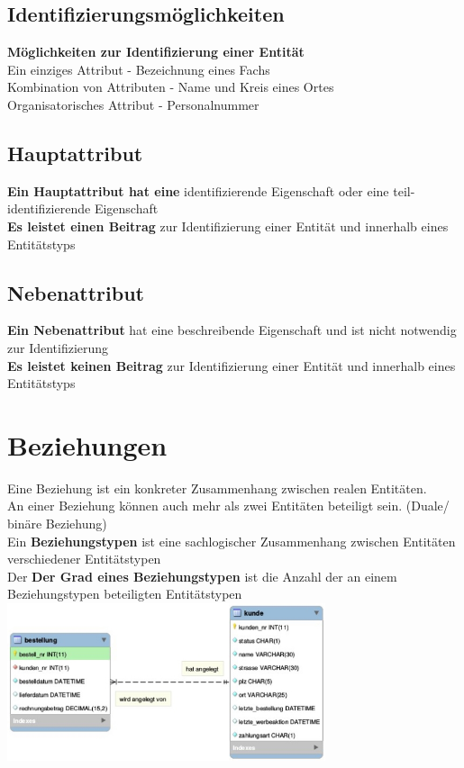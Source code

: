 \documentclass{scrreprt}
\newcommand\tab[1][1cm]{\hspace*{#1}}
\begin{document}
\subsection{Identifizierungsmöglichkeiten}
\textbf{Möglichkeiten zur Identifizierung einer Entität}
\\\tab Ein einziges Attribut - Bezeichnung eines Fachs
\\\tab Kombination von Attributen - Name und Kreis eines Ortes
\\\tab Organisatorisches Attribut - Personalnummer
\subsection{Hauptattribut}
\textbf{Ein Hauptattribut hat eine} identifizierende Eigenschaft oder eine teil-identifizierende Eigenschaft
\\\textbf{Es leistet einen Beitrag} zur Identifizierung einer Entität und innerhalb eines Entitätstyps
\subsection{Nebenattribut}
\textbf{Ein Nebenattribut} hat eine beschreibende Eigenschaft und ist nicht notwendig zur Identifizierung
\\\textbf{Es leistet keinen Beitrag} zur Identifizierung einer Entität und innerhalb eines Entitätstyps
\section{Beziehungen}
Eine Beziehung ist ein konkreter Zusammenhang zwischen realen Entitäten.
\\An einer Beziehung können auch mehr als zwei Entitäten beteiligt sein. (Duale/ binäre Beziehung)
\\Ein \textbf{Beziehungstypen} ist eine sachlogischer Zusammenhang zwischen Entitäten verschiedener Entitätstypen
\\Der \textbf{Der Grad eines Beziehungstypen} ist die Anzahl der an einem Beziehungstypen beteiligten Entitätstypen
\\\includegraphics[width=0.7\textwidth]{"graphics/bsp-bz"}
\end{document}
